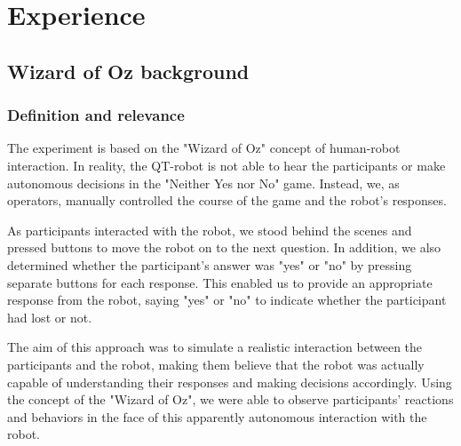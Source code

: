 \chapter{Experience}
\section{Wizard of Oz background}
\subsection{Definition and relevance}
The experiment is based on the "Wizard of Oz" concept of human-robot interaction. In reality, the QT-robot is not able to hear the participants or make autonomous decisions in the "Neither Yes nor No" game. Instead, we, as operators, manually controlled the course of the game and the robot's responses.

As participants interacted with the robot, we stood behind the scenes and pressed buttons to move the robot on to the next question. In addition, we also determined whether the participant's answer was "yes" or "no" by pressing separate buttons for each response. This enabled us to provide an appropriate response from the robot, saying "yes" or "no" to indicate whether the participant had lost or not.

The aim of this approach was to simulate a realistic interaction between the participants and the robot, making them believe that the robot was actually capable of understanding their responses and making decisions accordingly. Using the concept of the "Wizard of Oz", we were able to observe participants' reactions and behaviors in the face of this apparently autonomous interaction with the robot.\\
